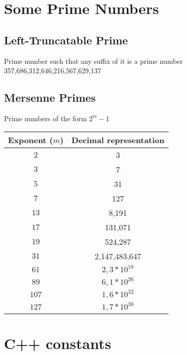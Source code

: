 \documentclass[11pt, a4paper, oneside]{book}
\begin{document}
\section{Some Prime Numbers}

\subsection{Left-Truncatable Prime}
\large{Prime number such that any suffix of it is a prime number} \\
\Large{357,686,312,646,216,567,629,137}

\subsection{Mersenne Primes}
\large{Prime numbers of the form $2^m-1$}
\begin{table}[h]
  \centering
  \begin{tabular}{|c|c|}
    \hline
    \textbf{Exponent ($m$)} & \textbf{Decimal representation} \\
    \hline
    \(2\) & 3 \\
    \hline
    \(3\) & 7 \\
    \hline
    \(5\) & 31 \\
    \hline
    \(7\) & 127 \\
    \hline
    \(13\) & 8,191 \\
    \hline
    \(17\) & 131,071 \\
    \hline
    \(19\) & 524,287 \\
    \hline
    \(31\) & 2,147,483,647 \\
    \hline
    \(61\) & $2,3 * 10^{18}$ \\
    \hline
    \(89\) & $6,1 * 10^{26}$ \\
    \hline
    \(107\) & $1,6 * 10^{32}$ \\
    \hline
    \(127\) & $1,7 * 10^{38}$ \\
    \hline
  \end{tabular}
\end{table}

\section{C++ constants}
\end{document}
